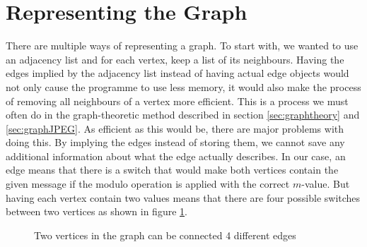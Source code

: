 \section{Representing the Graph}
There are multiple ways of representing a graph. 
To start with, we wanted to use an adjacency list and for each vertex, keep a list of its neighbours. 
Having the edges implied by the adjacency list instead of having actual edge objects would not only cause the programme to use less memory, it would also make the  process of removing all neighbours of a vertex more efficient. This is a process we must often do in the graph-theoretic method described in section \ref{sec:graphtheory} and \ref{sec:graphJPEG}. 
As efficient as this would be, there are major problems with doing this. 
By implying the edges instead of storing them, we cannot save any additional information about what the edge actually describes. 
In our case, an edge means that there is a switch that would make both vertices contain the given message if the modulo operation is applied with the correct $m$-value. 
But having each vertex contain two values means that there are four possible switches between two vertices as shown in figure \ref{fig:graphSwitches}.

\begin{figure}
\begin {center}
\end{center}
\caption{Two vertices in the graph can be connected 4 different edges}
\label{fig:graphSwitches}
\end{figure}

